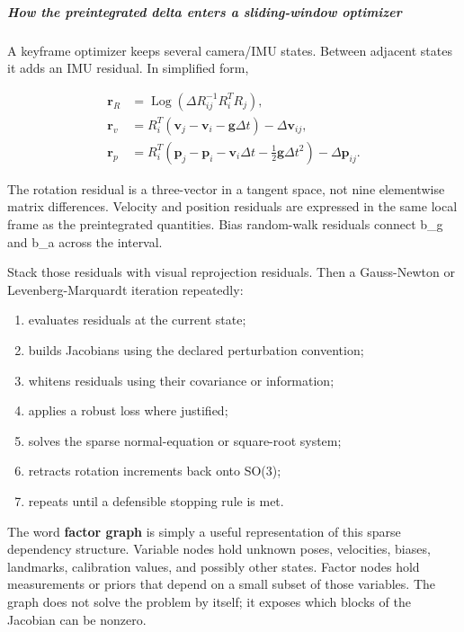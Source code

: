 \subparagraph{How the preintegrated delta enters a sliding-window optimizer}\label{04-visual-computing-ii-ch035-how-the-preintegrated-delta-enters-a-sliding-window-optimizer}

\hypertarget{04-visual-computing-ii-ch035-how-the-preintegrated-delta-enters-a-sliding-window-optimizer}{}

A keyframe optimizer keeps several camera/IMU states. Between adjacent states it adds an IMU residual. In simplified form,

\[
\begin{aligned}
\mathbf r_R &= \operatorname{Log}(\Delta R_{ij}^{-1}R_i^TR_j),\\
\mathbf r_v &= R_i^T(\mathbf v_j-\mathbf v_i-\mathbf g\Delta t)-\Delta\mathbf v_{ij},\\
\mathbf r_p &= R_i^T(\mathbf p_j-\mathbf p_i-\mathbf v_i\Delta t-\tfrac12\mathbf g\Delta t^2)-\Delta\mathbf p_{ij}.
\end{aligned}
\]

The rotation residual is a three-vector in a tangent space, not nine elementwise matrix differences. Velocity and position residuals are expressed in the same local frame as the preintegrated quantities. Bias random-walk residuals connect b\_g and b\_a across the interval.

Stack those residuals with visual reprojection residuals. Then a Gauss-Newton or Levenberg-Marquardt iteration repeatedly:

\begin{enumerate}
\def\labelenumi{\arabic{enumi}.}
\tightlist
\item
  evaluates residuals at the current state;
\item
  builds Jacobians using the declared perturbation convention;
\item
  whitens residuals using their covariance or information;
\item
  applies a robust loss where justified;
\item
  solves the sparse normal-equation or square-root system;
\item
  retracts rotation increments back onto SO(3);
\item
  repeats until a defensible stopping rule is met.
\end{enumerate}

The word \textbf{factor graph} is simply a useful representation of this sparse dependency structure. Variable nodes hold unknown poses, velocities, biases, landmarks, calibration values, and possibly other states. Factor nodes hold measurements or priors that depend on a small subset of those variables. The graph does not solve the problem by itself; it exposes which blocks of the Jacobian can be nonzero.

